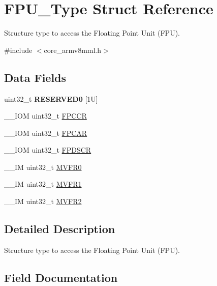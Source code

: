 \hypertarget{struct_f_p_u___type}{}\section{F\+P\+U\+\_\+\+Type Struct Reference}
\label{struct_f_p_u___type}


Structure type to access the Floating Point Unit (F\+PU).  




{\ttfamily \#include $<$core\+\_\+armv8mml.\+h$>$}

\subsection*{Data Fields}
\begin{DoxyCompactItemize}
\item 
\mbox{\label{struct_f_p_u___type_aeab77b3f17bf5a628cb743807d8fde7e}} 
uint32\+\_\+t {\bfseries R\+E\+S\+E\+R\+V\+E\+D0} \mbox{[}1\+U\mbox{]}
\item 
\+\_\+\+\_\+\+I\+OM uint32\+\_\+t \hyperlink{struct_f_p_u___type_af1b708c5e413739150df3d16ca3b7061}{F\+P\+C\+CR}
\item 
\+\_\+\+\_\+\+I\+OM uint32\+\_\+t \hyperlink{struct_f_p_u___type_a55263b468d0f8e11ac77aec9ff87c820}{F\+P\+C\+AR}
\item 
\+\_\+\+\_\+\+I\+OM uint32\+\_\+t \hyperlink{struct_f_p_u___type_a58d1989664a06db6ec2e122eefa9f04a}{F\+P\+D\+S\+CR}
\item 
\+\_\+\+\_\+\+IM uint32\+\_\+t \hyperlink{struct_f_p_u___type_a4f19014defe6033d070b80af19ef627c}{M\+V\+F\+R0}
\item 
\+\_\+\+\_\+\+IM uint32\+\_\+t \hyperlink{struct_f_p_u___type_a66f8cfa49a423b480001a4e101bf842d}{M\+V\+F\+R1}
\item 
\+\_\+\+\_\+\+IM uint32\+\_\+t \hyperlink{struct_f_p_u___type_a479130e53a8b3c36fd8ee38b503a3911}{M\+V\+F\+R2}
\end{DoxyCompactItemize}


\subsection{Detailed Description}
Structure type to access the Floating Point Unit (F\+PU). 

\subsection{Field Documentation}
\mbox{\label{struct_f_p_u___type_a55263b468d0f8e11ac77aec9ff87c820}} 
